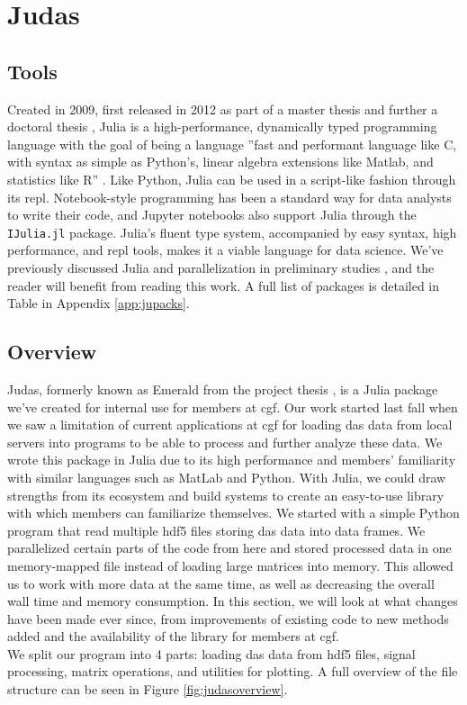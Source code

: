 \section{Judas}
\label{met:Judas}

\subsection{Tools}
\label{met:Julia}

Created in 2009, first released in 2012 as part of a master thesis \cite{juliaMs} and further a doctoral thesis \cite{juliaPHD}, Julia is a high-performance, dynamically typed programming language with the goal of being a language ''fast and performant language like C, with syntax as simple as Python's, linear algebra extensions like Matlab, and statistics like R'' \cite{julia}. Like Python, Julia can be used in a script-like fashion through its \acrfull{repl}. Notebook-style programming has been a standard way for data analysts to write their code, and Jupyter notebooks also support Julia through the \texttt{IJulia.jl} package. Julia's fluent type system, accompanied by easy syntax, high performance, and \acrshort{repl} tools, makes it a viable language for data science. We've previously discussed Julia and parallelization in preliminary studies \cite{projthesis}, and the reader will benefit from reading this work. A full list of packages is detailed in Table in Appendix \ref{app:jupacks}.

\subsection{Overview}
\label{met:judasoverview}

Judas, formerly known as Emerald from the project thesis \cite{projthesis}, is a Julia package we've created for internal use for members at \acrshort{cgf}. Our work started last fall when we saw a limitation of current applications at \acrshort{cgf} for loading \acrshort{das} data from local servers into programs to be able to process and further analyze these data. We wrote this package in Julia due to its high performance and members' familiarity with similar languages such as MatLab and Python. With Julia, we could draw strengths from its ecosystem and build systems to create an easy-to-use library with which members can familiarize themselves. We started with a simple Python program that read multiple \acrshort{hdf5} files storing \acrshort{das} data into data frames. We parallelized certain parts of the code from here and stored processed data in one memory-mapped file instead of loading large matrices into memory. This allowed us to work with more data at the same time, as well as decreasing the overall wall time and memory consumption.  
In this section, we will look at what changes have been made ever since, from improvements of existing code to new methods added and the availability of the library for members at \acrshort{cgf}. \\
We split our program into 4 parts: loading \acrshort{das} data from \acrshort{hdf5} files, signal processing, matrix operations, and utilities for plotting. A full overview of the file structure can be seen in Figure \ref{fig:judasoverview}.\\

